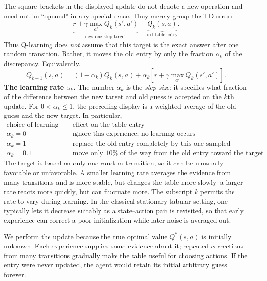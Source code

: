 \documentclass[11pt,a4paper]{article}
\theoremstyle{definition}
\begin{document}
\begin{note}
The square brackets in the displayed update do not denote a new operation and need not be
``opened'' in any special sense. They merely group the TD error:
\[
\underbrace{r+\gamma\max_{a'}Q_k(s',a')}_{\text{new one-step target}}
-
\underbrace{Q_k(s,a)}_{\text{old table entry}}.
\]
Thus Q-learning does \emph{not} assume that this target is the exact answer after one random
transition. Rather, it moves the old entry by only the fraction $\alpha_k$ of the discrepancy.
Equivalently,
\[
Q_{k+1}(s,a)
=(1-\alpha_k)Q_k(s,a)
+\alpha_k\left[r+\gamma\max_{a'}Q_k(s',a')\right].
\]
\textbf{The learning rate \(\alpha_k\).} The number $\alpha_k$ is the \emph{step size}: it
specifies what fraction of the difference between the new target and old guess is accepted on
the $k$th update. For $0<\alpha_k\leq 1$, the preceding display is a weighted average of the
old guess and the new target. In particular,
\[
\begin{array}{c|c}
\text{choice of learning rate} & \text{effect on the table entry}\\
\hline
\alpha_k=0 & \text{ignore this experience; no learning occurs}\\
\alpha_k=1 & \text{replace the old entry completely by this one sampled target}\\
\alpha_k=0.1 & \text{move only \(10\%\) of the way from the old entry toward the target}
\end{array}
\]
The target is based on only one random transition, so it can be unusually favorable or
unfavorable. A smaller learning rate averages the evidence from many transitions and is more
stable, but changes the table more slowly; a larger rate reacts more quickly, but can fluctuate
more. The subscript $k$ permits the rate to vary during learning. In the classical stationary
tabular setting, one typically lets it decrease suitably as a state--action pair is revisited,
so that early experience can correct a poor initialization while later noise is averaged out.

We perform the update because the true optimal value $Q^*(s,a)$ is initially unknown. Each
experience supplies some evidence about it; repeated corrections from many transitions gradually
make the table useful for choosing actions. If the entry were never updated, the agent would
retain its initial arbitrary guess forever.


\end{note}
\end{document}
